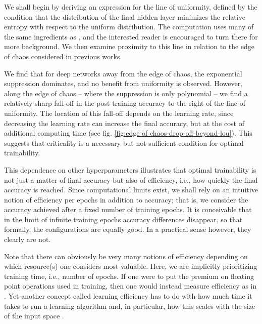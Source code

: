 We shall begin by deriving an expression for the line of uniformity, defined by the condition that the distribution of the final hidden layer minimizes the relative entropy with respect to the uniform distribution. The computation uses many of the same ingredients as \cite{2016arXiv161101232S}, and the interested reader is encouraged to turn there for more background. We then examine proximity to this line in relation to the edge of chaos considered in previous works. 

We find that for deep networks away from the edge of chaos, the exponential suppression dominates, and no benefit from uniformity is observed. However, along the edge of chaos -- where the suppression is only polynomial -- we find a relatively sharp fall-off in the post-training accuracy to the right of the line of uniformity. The location of this fall-off depends on the learning rate, since decreasing the learning rate can increase the final accuracy, but at the cost of additional computing time (see fig. \ref{fig:edge of chaos-drop-off-beyond-lou}). This suggests that criticality is a necessary but not sufficient condition for optimal trainability. 

This dependence on other hyperparameters illustrates that optimal trainability is not just a matter of final accuracy but also of efficiency, i.e., how quickly the final accuracy is reached. Since computational limits exist, we shall rely on an intuitive notion of efficiency per epochs in addition to accuracy; that is, we consider the accuracy achieved after a fixed number of training epochs. It is conceivable that in the limit of infinite training epochs accuracy differences disappear, so that formally, the configurations are equally good. In a practical sense however, they clearly are not.

Note that there can obviously be very many notions of efficiency depending on which resource(s) one considers most valuable. Here, we are implicitly prioritizing training time, i.e., number of epochs. If one were to put the premium on floating point operations used in training, then one would instead measure efficiency as in \cite{2020arXiv200504305H}. Yet another concept called learning efficiency has to do with how much time it takes to run a learning algorithm and, in particular, how this scales with the size of the input space \cite{2014arXiv1410.1141L}. 

